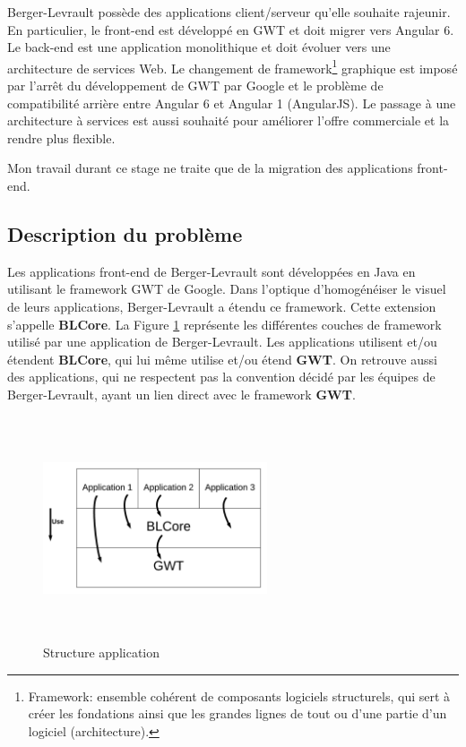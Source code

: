 \documentclass[11pt,]{article}
\begin{document}
Berger-Levrault possède des applications client/serveur qu'elle souhaite
rajeunir. En particulier, le front-end est développé en GWT et doit
migrer vers Angular 6. Le back-end est une application monolithique et
doit évoluer vers une architecture de services Web. Le changement de
framework\footnote{Framework: ensemble cohérent de composants logiciels
  structurels, qui sert à créer les fondations ainsi que les grandes
  lignes de tout ou d'une partie d'un logiciel (architecture).}
graphique est imposé par l'arrêt du développement de GWT par Google et
le problème de compatibilité arrière entre Angular 6 et Angular 1
(AngularJS). Le passage à une architecture à services est aussi souhaité
pour améliorer l'offre commerciale et la rendre plus flexible.

Mon travail durant ce stage ne traite que de la migration des
applications front-end.

\hypertarget{description-du-probluxe8me}{%
\subsection{Description du problème}\label{description-du-probluxe8me}}

Les applications front-end de Berger-Levrault sont développées en Java
en utilisant le framework GWT de Google. Dans l'optique d'homogénéiser
le visuel de leurs applications, Berger-Levrault a étendu ce framework.
Cette extension s'appelle \textbf{BLCore}. La Figure
\ref{architectureBL} représente les différentes couches de framework
utilisé par une application de Berger-Levrault. Les applications
utilisent et/ou étendent \textbf{BLCore}, qui lui même utilise et/ou
étend \textbf{GWT}. On retrouve aussi des applications, qui ne
respectent pas la convention décidé par les équipes de Berger-Levrault,
ayant un lien direct avec le framework \textbf{GWT}.

\hypertarget{architectureBL}{%
\begin{figure}
\centering
\includegraphics[width=2.60417in,height=2.60417in]{figures/structure.png}
\caption{Structure application}\label{architectureBL}
\end{figure}
}
\end{document}
